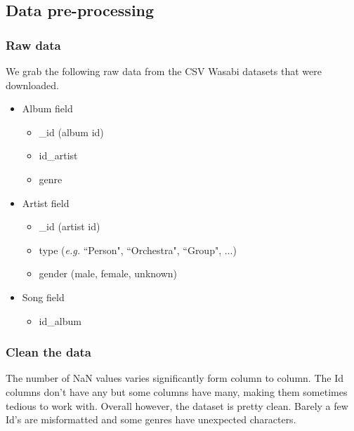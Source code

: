 \documentclass[a4paper, 11pt, oneside]{article}
\begin{document}
\subsection{Data pre-processing}
\subsubsection{Raw data}

We grab the following raw data from the CSV Wasabi datasets that were downloaded.
\begin{itemize}
    \item Album field
          \begin{itemize}
              \item \_id (album id)
              \item id\_artist
              \item genre
          \end{itemize}
    \item Artist field
          \begin{itemize}
              \item \_id (artist id)
              \item type (\textit{e.g.} ``Person", ``Orchestra", ``Group", ...)
              \item gender (male, female, unknown)
          \end{itemize}
    \item Song field
          \begin{itemize}
              \item id\_album
          \end{itemize}
\end{itemize}

\subsubsection{Clean the data}
The number of NaN values varies significantly form column to column. The Id columns don't have any but some columns have many, making them sometimes tedious to work with.
Overall however, the dataset is pretty clean. Barely a few Id's are misformatted and some genres have unexpected characters.
\end{document}
